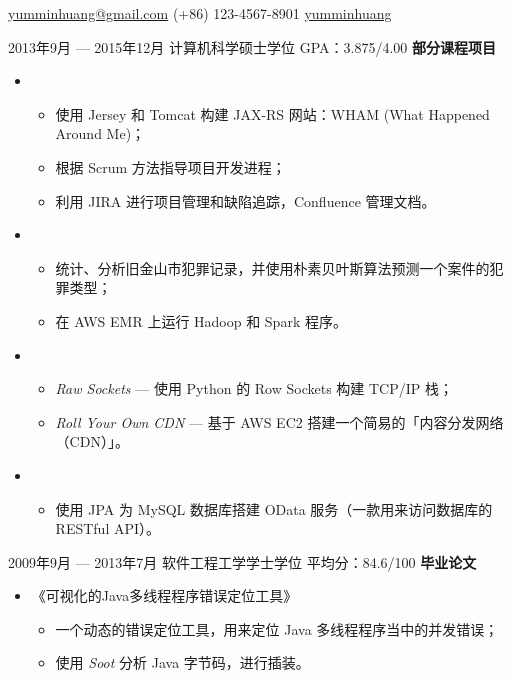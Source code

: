\documentclass{newresume}
\begin{document}
{\href{mailto:yumminhuang@gmail.com}{yumminhuang@gmail.com}}
{(+86) 123-4567-8901}
{\href{https://github.com/yumminhuang}{yumminhuang}}
{}


\begin{body}
	{2013年9月 --- 2015年12月}
	{计算机科学硕士学位}
	{GPA：3.875/4.00}
	\textbf{部分课程项目}
	\begin{itemize}
	\item {}
	\begin{itemize}
		\item 使用 Jersey 和 Tomcat 构建 JAX-RS 网站：WHAM (What Happened Around Me)；
		\item 根据 Scrum 方法指导项目开发进程；
		\item 利用 JIRA 进行项目管理和缺陷追踪，Confluence 管理文档。
	\end{itemize}

	\item {}
	\begin{itemize}
		\item 统计、分析旧金山市犯罪记录，并使用朴素贝叶斯算法预测一个案件的犯罪类型；
		\item 在 AWS EMR 上运行 Hadoop 和 Spark 程序。
	\end{itemize}

	\item {}
	\begin{itemize}
		\item \textit{Raw Sockets} --- 使用 Python 的 Row Sockets 构建 TCP/IP 栈；
		\item \textit{Roll Your Own CDN} --- 基于 AWS EC2 搭建一个简易的「内容分发网络（CDN）」。
	\end{itemize}

	\item {}
	\begin{itemize}
		\item 使用 JPA 为 MySQL 数据库搭建 OData 服务（一款用来访问数据库的 RESTful API）。
	\end{itemize}

	\end{itemize}

	\smallskip
	{2009年9月 --- 2013年7月}
	{软件工程工学学士学位}
	{平均分：84.6/100}
	\textbf{毕业论文}
	\begin{itemize}
	\item 《可视化的Java多线程程序错误定位工具》
	\begin{itemize}
		\item 一个动态的错误定位工具，用来定位 Java 多线程程序当中的并发错误；
		\item 使用 \textit{Soot} 分析 Java 字节码，进行插装。
	\end{itemize}
	\end{itemize}
\end{body}
\end{document}
